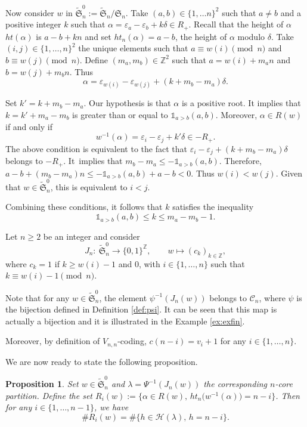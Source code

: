 \documentclass[10pt,a4paper]{amsart}
\newtheorem{Proposition}[Theorem]{Proposition}
 { \theoremstyle{definition}
\newtheorem{Definition}[Theorem]{Definition}
\newtheorem{Note}[Theorem]{Note}
\newtheorem{Example}[Theorem]{Example}
\newtheorem{Remark}[Theorem]{Remark} }
\numberwithin{equation}{section}
\def\cch{\mathcal H}
\newcommand{\Z}{\mathbb{Z}}
\begin{document}
Now consider $w$ in $\widetilde{\mathfrak{S}}^0_n:=\widetilde{\mathfrak{S}}_{n}/\mathfrak{S}_{n}$. Take $(a,b)\in\lbrace 1,\dots n\rbrace^2$ such that $a\neq b$ and a positive integer $k$ such that $\alpha=\varepsilon_a-\varepsilon_b+k\delta\in R_+$. Recall that the height of $\alpha$ $ht(\alpha)$ is $a-b+kn$ and set $ht_n(\alpha)=a-b$, the height of $\alpha$ modulo $\delta$. Take $(i,j)\in\lbrace 1,\dots,n\rbrace^2$ the unique elements such that $a\equiv w(i)\pmod{n}$ and $b\equiv w(j)\pmod{n}$. Define $(m_a,m_b)\in\Z^2$ such that $a=w(i)+m_an$ and $b=w(j)+m_bn$. Thus
\[\alpha=\varepsilon_{w(i)}-\varepsilon_{w(j)}+(k+m_b-m_a)\delta.\]

Set $k'=k+m_b-m_a$. Our hypothesis is that $\alpha$ is a positive root. It implies that $k=k'+m_a-m_b$ is greater than or equal to $\mathds{1}_{a>b}(a,b)$.
Moreover, $\alpha\in R(w)$ if and only if
\[w^{-1}(\alpha)=\varepsilon_i-\varepsilon_j+k'\delta\in -R_+.\]
The above condition is equivalent to the fact that $\varepsilon_i-\varepsilon_j+(k+m_b-m_a)\delta$ belongs to $-R_+$. It~implies that $m_b-m_a\leq -\mathds{1}_{a>b}(a,b)$. Therefore, $a-b+(m_b-m_a)n\leq-\mathds{1}_{a>b}(a,b)+a-b<0$. Thus $w(i)<w(j)$. Given that $w\in\widetilde{\mathfrak{S}}^0_n$, this is equivalent to $i<j$.

Combining these conditions, it follows that $k$ satisfies the inequality
\begin{equation}\label{eq:ineg}
\mathds{1}_{a>b}(a,b)\leq k\leq m_a-m_b-1.
\end{equation}


 Let $n \geq 2$ be an integer and consider
\[
J_n\colon \   \widetilde{\mathfrak{S}}^0_n   \to   \lbrace 0,1\rbrace^{\Z}, \qquad
  w   \mapsto   (c_k)_{k\in\Z},
\]
where $c_k=1$ if $k\geq w(i)-1$ and $0$, with $i\in\lbrace 1,\dots,n\rbrace$ such that $k\equiv w(i)-1\pmod{n}$.

Note that for any $w\in\widetilde{\mathfrak{S}}^0_n$, the element $\psi^{-1}(J_n(w))$ belongs to $\mathcal{C}_n$, where $\psi$ is the bijection defined in Definition \ref{def:psi}. It can be seen that this map is actually a bijection and it is illustrated in the Example \ref{ex:exfin}.

Moreover, by definition of $V_{n,n}$-coding, $c(n-i)=v_i+1$ for any $i\in\lbrace 1,\dots,n\rbrace$.

We are now ready to state the following proposition.
\begin{Proposition}\label{prop:inversion}
Set $w\in\widetilde{\mathfrak{S}}^0_n$ and $\lambda=\Psi^{-1}(J_n(w))$ the corresponding $n$-core partition. Define the set $R_i(w):=\bigl\lbrace \alpha\in R(w),\, ht_n\bigl(w^{-1}(\alpha)\bigr)=n-i\bigr\rbrace$.
Then for any $i\in\lbrace 1,\dots,n-1\rbrace$, we have
\[\#R_i(w)=\#\lbrace h\in \cch(\lambda),\, h=n-i\rbrace.\]
\end{Proposition}
\end{document}
